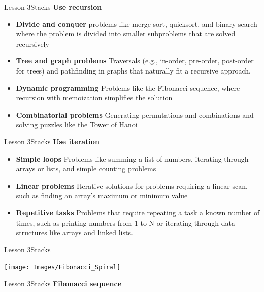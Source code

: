 \documentclass[aspectratio=1610]{beamer}
\begin{document}
\begin{frame}{Lesson 3}{Stacks}
\LARGE
\textbf{Use recursion}\\
\Large
\begin{itemize}
    \item \textbf{Divide and conquer} problems like merge sort, quicksort, and binary search where the problem is divided into smaller subproblems that are solved recursively 
    \item \textbf{Tree and graph problems} Traversals (e.g., in-order, pre-order, post-order for trees) and pathfinding in graphs that naturally fit a recursive approach.
    \item \textbf{Dynamic programming} Problems like the Fibonacci sequence, where recursion with memoization simplifies the solution
    \item \textbf{Combinatorial problems} Generating permutations and combinations and solving puzzles like the Tower of Hanoi
\end{itemize}
\end{frame}



\begin{frame}{Lesson 3}{Stacks}
\LARGE
\textbf{Use iteration}\\
\Large
\begin{itemize}
    \item \textbf{Simple loops} Problems like summing a list of numbers, iterating through arrays or lists, and simple counting problems
    \item \textbf{Linear problems} Iterative solutions for problems requiring a linear scan, such as finding an array’s maximum or minimum value
    \item  \textbf{Repetitive tasks} Problems that require repeating a task a known number of times, such as printing numbers from 1 to N or iterating through data structures like arrays and linked lists.
\end{itemize}
\end{frame}


\begin{frame}{Lesson 3}{Stacks}
\begin{center}
\texttt{[image: Images/Fibonacci\_Spiral]}
\end{center}
\end{frame}



\begin{frame}{Lesson 3}{Stacks}
\Huge 
\textbf{Fibonacci sequence}
\end{frame}
\end{document}
